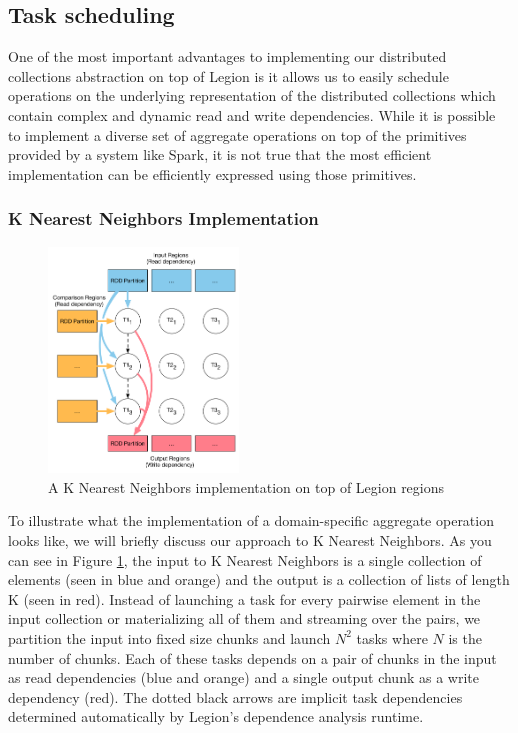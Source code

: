 \documentclass[tog]{acmsiggraph}
\begin{document}

\subsection{Task scheduling}

One of the most important advantages to implementing our distributed
collections abstraction on top of Legion is it allows us to easily schedule
operations on the underlying representation of the distributed collections
which contain complex and dynamic read and write dependencies. While it is
possible to implement a diverse set of aggregate operations on top of the
primitives provided by a system like Spark, it is not true that the most
efficient implementation can be efficiently expressed using those primitives.

\subsubsection{K Nearest Neighbors Implementation}

\begin{figure}
\includegraphics[width=0.45\textwidth]{figures/knn}
\caption{A K Nearest Neighbors implementation on top of Legion regions}
\label{fig:knn}
\end{figure}

To illustrate what the implementation of a domain-specific aggregate operation
looks like, we will briefly discuss our approach to K Nearest Neighbors. As you
can see in Figure \ref{fig:knn}, the input to K Nearest Neighbors is a single
collection of elements (seen in blue and orange) and the output is a collection
of lists of length K (seen in red). Instead of launching a task for every
pairwise element in the input collection or materializing all of them and
streaming over the pairs, we partition the input into fixed size chunks and
launch \(N^2\) tasks where \(N\) is the number of chunks. Each of these tasks
depends on a pair of chunks in the input as read dependencies (blue and orange)
and a single output chunk as a write dependency (red). The dotted black arrows
are implicit task dependencies determined automatically by Legion's dependence
analysis runtime.
\end{document}
